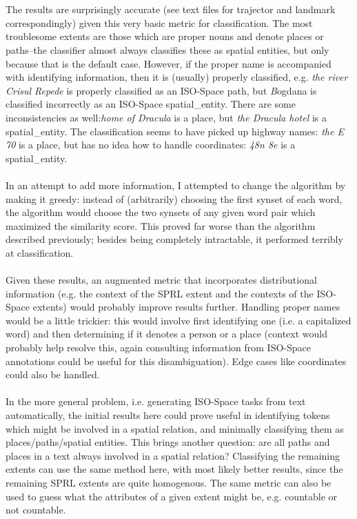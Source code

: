 \documentclass{article}
\begin{document}
\\
\\
The results are surprisingly accurate (see text files for {\sc trajector} and {\sc landmark} correspondingly) given this very basic metric for classification.  The most troublesome extents are those which are proper nouns and denote places or paths--the classifier almost always classifies these as spatial entities, but only because that is the default case.  However, if the proper name is accompanied with identifying information, then it is (usually) properly classified, e.g. \emph{the river Crisul Repede} is properly classified as an ISO-Space {\sc path}, but {\emph Bogdana} is classified incorrectly as an ISO-Space {\sc spatial\_entity}.  There are some inconsistencies as well:\emph{home of Dracula} is a {\sc place}, but \emph{the Dracula hotel} is a {\sc spatial\_entity}.  The classification seems to have picked up highway names: \emph{the E 70} is a {\sc place}, but has no idea how to handle coordinates: \emph{48n 8e} is a {\sc spatial\_entity}.
\\
\\
In an attempt to add more information, I attempted to change the algorithm by making it greedy: instead of (arbitrarily) choosing the first synset of each word, the algorithm would choose the two synsets of any given word pair which maximized the similarity score.  This proved far worse than the algorithm described previously; besides being completely intractable, it performed terribly at classification.  
\\
\\
Given these results, an augmented metric that incorporates distributional information (e.g. the context of the SPRL extent and the contexts of the ISO-Space extents) would probably improve results further.  Handling proper names would be a little trickier: this would involve first identifying one (i.e. a capitalized word) and then determining if it denotes a person or a place (context would probably help resolve this, again consulting information from ISO-Space annotations could be useful for this disambiguation).  Edge cases like coordinates could also be handled.  
\\
\\
In the more general problem, i.e. generating ISO-Space tasks from text automatically, the initial results here could prove useful in identifying tokens which might be involved in a spatial relation, and minimally classifying them as places/paths/spatial entities.  This brings another question: are all paths and places in a text always involved in a spatial relation?  Classifying the remaining extents can use the same method here, with most likely better results, since the remaining SPRL extents are quite homogenous.  The same metric can also be used to guess what the attributes of a given extent might be, e.g. countable or not countable.  
\end{document}
